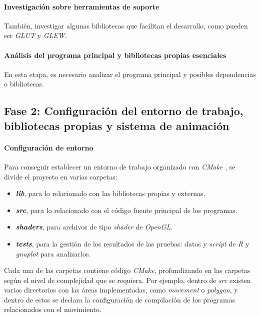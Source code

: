 \paragraph{Investigación sobre herramientas de soporte} También, investigar algunas bibliotecas que facilitan el desarrollo, como pueden ser \textit{GLUT} y \textit{GLEW}. 

\paragraph{Análisis del programa principal y bibliotecas propias esenciales} En esta etapa, es necesario analizar el programa principal y posibles dependencias o bibliotecas.

\subsection{Fase 2: Configuración del entorno de trabajo, bibliotecas propias y sistema de animación}\label{sub:phase-2}

\paragraph{Configuración de entorno}
Para conseguir establecer un entorno de trabajo organizado con \textit{CMake} \cite{webCMakeDocs}, se divide el proyecto en varias carpetas:

\begin{itemize}

    \item \textbf{\textit{lib}}, para lo relacionado con las bibliotecas propias y externas.
    
    \item \textbf{\textit{src}}, para lo relacionado con el código fuente principal de los programas.
    
    \item \textbf{\textit{shaders}}, para archivos de tipo \textit{shader} de \textit{OpenGL}.
    
    \item \textbf{\textit{tests}}, para la gestión de los resultados de las pruebas: datos y \textit{script} de \textit{R} y \textit{gnuplot} para analizarlos.
    
\end{itemize}
Cada una de las carpetas contiene código \textit{CMake}, profundizando en las carpetas según el nivel de complejidad que se requiera. Por ejemplo, dentro de \textit{src} existen varios directorios con las áreas implementadas, como \textit{movement} o \textit{polygon}, y dentro de estos se declara la configuración de compilación de los programas relacionados con el movimiento.

